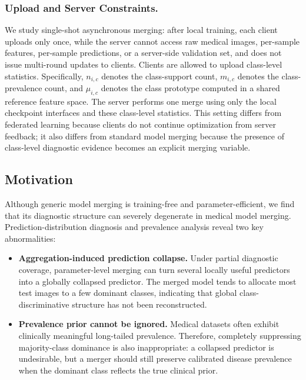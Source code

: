 \documentclass[letterpaper]{article} %
\begin{document}
\subsubsection{Upload and Server Constraints.}

We study single-shot asynchronous merging: after local training, each client uploads only once, while the server cannot access raw medical images, per-sample features, per-sample predictions, or a server-side validation set, and does not issue multi-round updates to clients. Clients are allowed to upload class-level statistics. Specifically, $n_{i,c}$ denotes the class-support count, $m_{i,c}$ denotes the class-prevalence count, and $\mu_{i,c}$ denotes the class prototype computed in a shared reference feature space. The server performs one merge using only the local checkpoint interfaces and these class-level statistics. This setting differs from federated learning because clients do not continue optimization from server feedback; it also differs from standard model merging because the presence of class-level diagnostic evidence becomes an explicit merging variable.

\subsection{Motivation}

Although generic model merging is training-free and parameter-efficient, we find that its diagnostic structure can severely degenerate in medical model merging. Prediction-distribution diagnosis and prevalence analysis reveal two key abnormalities:
\begin{itemize}
    \item \textbf{Aggregation-induced prediction collapse.} Under partial diagnostic coverage, parameter-level merging can turn several locally useful predictors into a globally collapsed predictor. The merged model tends to allocate most test images to a few dominant classes, indicating that global class-discriminative structure has not been reconstructed.
    \item \textbf{Prevalence prior cannot be ignored.} Medical datasets often exhibit clinically meaningful long-tailed prevalence. Therefore, completely suppressing majority-class dominance is also inappropriate: a collapsed predictor is undesirable, but a merger should still preserve calibrated disease prevalence when the dominant class reflects the true clinical prior.
\end{itemize}
\end{document}

